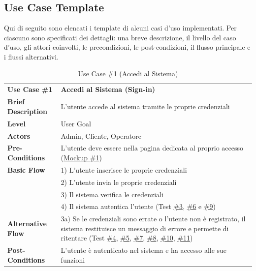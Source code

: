 \documentclass{article}
\begin{document}
\subsection{Use Case Template}
Qui di seguito sono elencati i template di alcuni casi d'uso implementati. Per ciascuno sono specificati dei dettagli: una breve descrizione, il livello del caso d'uso, gli attori coinvolti, le precondizioni, le post-condizioni, il flusso principale e i flussi alternativi.
\\

    \renewcommand{\arraystretch}{1.5}
    
    \begin{table}[h]
        \begin{tabularx}{\textwidth}{ | l  X | }
            \rowcolor{lightgray!70}
            \hline
            \textbf{Use Case \#1} & \textbf{Accedi al Sistema (Sign-in)}\\[0.5ex]
            \textbf{Brief Description} & L'utente accede al sistema tramite le proprie credenziali \\
            \rowcolor{blue!10}
            \textbf{Level} & User Goal \\
            \textbf{Actors} & Admin, Cliente, Operatore \\
            \rowcolor{blue!10}
            \textbf{Pre-Conditions} & L'utente deve essere nella pagina dedicata al proprio accesso (\hyperref[fig:mockup_1]{Mockup \#1}) \\
            \textbf{Basic Flow} & 1) L'utente inserisce le proprie credenziali\\
            & 2) L'utente invia le proprie credenziali\\
            & 3) Il sistema verifica le credenziali\\
            & 4) Il sistema autentica l'utente (Test \hyperref[test_3]{\#3}, \hyperref[test_6]{\#6} e \hyperref[test_9]{\#9})  \\        
            \rowcolor{blue!10}
            \textbf{Alternative Flow} & 3a) Se le credenziali sono errate o l'utente non è registrato, il sistema restituisce un messaggio di errore e permette di ritentare (Test \hyperref[test_4]{\#4}, \hyperref[test_5]{\#5}, \hyperref[test_7]{\#7}, \hyperref[test_8]{\#8}, \hyperref[test_10]{\#10}, \hyperref[test_11]{\#11})\\
            \textbf{Post-Conditions} & L'utente è autenticato nel sistema e ha accesso alle sue funzioni \\
            \hline
        \end{tabularx}
        \label{use_case_1}
        \caption{Use Case \#1 (Accedi al Sistema)}
    \end{table}
    
\end{document}
